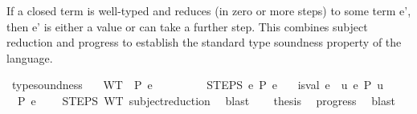 \begin{isabellebody}
\begin{isamarkuptext}
  If a closed term is well-typed and reduces (in zero or more steps)
  to some term e', then e' is either a value or can take a further step.
  This combines subject reduction and progress to establish
  the standard type soundness property of the language.%
\end{isamarkuptext}\isamarkuptrue%
\isamarkupfalse%
\ type{\isacharunderscore}{\kern0pt}soundness{\isacharcolon}{\kern0pt}\isanewline
\ \ \ WT{\isacharcolon}{\kern0pt}\ {\isachardoublequoteopen}{\isacharbrackleft}{\kern0pt}{\isacharbrackright}{\kern0pt}\ {\isasymturnstile}{\isacharbraceleft}{\kern0pt}P{\isacharbraceright}{\kern0pt}\ e\ {\isacharcolon}{\kern0pt}\ {\isasymtau}{\isachardoublequoteclose}\isanewline
\ \ \ \ \ \ \ STEPS{\isacharcolon}{\kern0pt}\ {\isachardoublequoteopen}e\ {\isacharminus}{\kern0pt}{\isachargreater}{\kern0pt}{\isacharbraceleft}{\kern0pt}P{\isacharbraceright}{\kern0pt}{\isacharasterisk}{\kern0pt}\ e{\isacharprime}{\kern0pt}{\isachardoublequoteclose}\isanewline
\ \ \ {\isachardoublequoteopen}is{\isacharunderscore}{\kern0pt}val\ e{\isacharprime}{\kern0pt}\ {\isasymor}\ {\isacharparenleft}{\kern0pt}{\isasymexists}u{\isachardot}{\kern0pt}\ e{\isacharprime}{\kern0pt}\ {\isacharminus}{\kern0pt}{\isachargreater}{\kern0pt}{\isacharbraceleft}{\kern0pt}P{\isacharbraceright}{\kern0pt}\ u{\isacharparenright}{\kern0pt}{\isachardoublequoteclose}\isanewline
%
\isadelimproof
%
\endisadelimproof
%
\isatagproof
{}\isamarkupfalse%
\ {\isacharminus}{\kern0pt}\isanewline
\ \ \isamarkupfalse%
\ {\isachardoublequoteopen}{\isacharbrackleft}{\kern0pt}{\isacharbrackright}{\kern0pt}\ {\isasymturnstile}{\isacharbraceleft}{\kern0pt}P{\isacharbraceright}{\kern0pt}\ e{\isacharprime}{\kern0pt}\ {\isacharcolon}{\kern0pt}\ {\isasymtau}{\isachardoublequoteclose}\ \isamarkupfalse%
\ STEPS\ WT\ subject{\isacharunderscore}{\kern0pt}reduction{\isacharprime}{\kern0pt}\ \isamarkupfalse%
\ blast\isanewline
\ \ \isamarkupfalse%
\ {\isacharquery}{\kern0pt}thesis\ \isamarkupfalse%
\ progress{\isacharprime}{\kern0pt}\ \isamarkupfalse%
\ blast\isanewline
{}\isamarkupfalse%
%
\endisatagproof
{\isafoldproof}%
%
\isadelimproof
\isanewline
%
\endisadelimproof
\isanewline
%
\isadelimtheory
\isanewline
%
\endisadelimtheory
%
\isatagtheory
{}\isamarkupfalse%
%
\endisatagtheory
{\isafoldtheory}%
%
\isadelimtheory
%
\endisadelimtheory
%
\end{isabellebody}%
